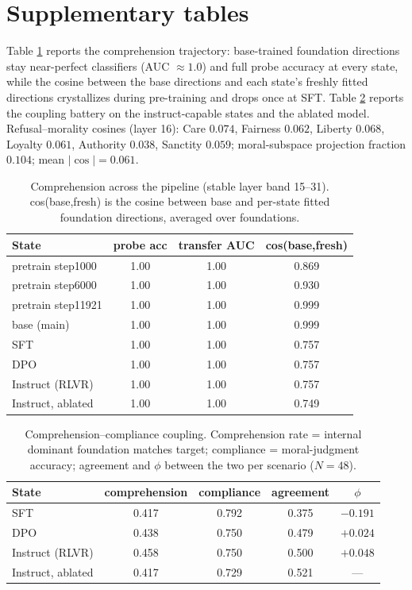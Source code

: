 \section{Supplementary tables}\label{appendix-a.-supplementary-tables}

Table \ref{tab:transfer} reports the comprehension trajectory: base-trained
foundation directions stay near-perfect classifiers (AUC \(\approx 1.0\)) and full
probe accuracy at every state, while the cosine between the base directions and
each state's freshly fitted directions crystallizes during pre-training and
drops once at SFT. Table \ref{tab:coupling} reports the coupling battery on the
instruct-capable states and the ablated model. Refusal--morality cosines
(layer 16): Care \(0.074\), Fairness \(0.062\), Liberty \(0.068\), Loyalty \(0.061\),
Authority \(0.038\), Sanctity \(0.059\); moral-subspace projection fraction \(0.104\);
mean \(|\cos| = 0.061\).

\begin{table}[h]
\centering
\caption{Comprehension across the pipeline (stable layer band 15--31).
cos(base,fresh) is the cosine between base and per-state fitted foundation
directions, averaged over foundations.}
\label{tab:transfer}
\begin{tabular}{lccc}
\toprule
State & probe acc & transfer AUC & cos(base,fresh) \\
\midrule
pretrain step1000   & 1.00 & 1.00 & 0.869 \\
pretrain step6000   & 1.00 & 1.00 & 0.930 \\
pretrain step11921  & 1.00 & 1.00 & 0.999 \\
base (main)         & 1.00 & 1.00 & 0.999 \\
SFT                 & 1.00 & 1.00 & 0.757 \\
DPO                 & 1.00 & 1.00 & 0.757 \\
Instruct (RLVR)     & 1.00 & 1.00 & 0.757 \\
Instruct, ablated   & 1.00 & 1.00 & 0.749 \\
\bottomrule
\end{tabular}
\end{table}

\begin{table}[h]
\centering
\caption{Comprehension--compliance coupling. Comprehension rate = internal
dominant foundation matches target; compliance = moral-judgment accuracy;
agreement and $\phi$ between the two per scenario ($N=48$).}
\label{tab:coupling}
\begin{tabular}{lcccc}
\toprule
State & comprehension & compliance & agreement & $\phi$ \\
\midrule
SFT              & 0.417 & 0.792 & 0.375 & $-0.191$ \\
DPO              & 0.438 & 0.750 & 0.479 & $+0.024$ \\
Instruct (RLVR)  & 0.458 & 0.750 & 0.500 & $+0.048$ \\
Instruct, ablated& 0.417 & 0.729 & 0.521 & --- \\
\bottomrule
\end{tabular}
\end{table}


